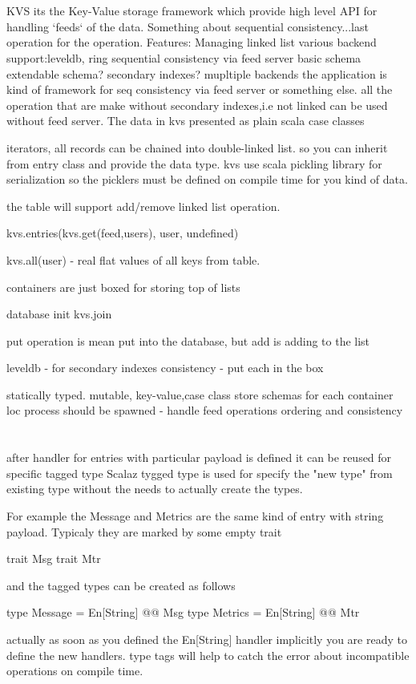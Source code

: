 \section{}
KVS its the Key-Value storage framework which provide high level API for handling `feeds` of the data.
Something about sequential consistency...last operation for the operation.
Features:
Managing linked list
various backend support:leveldb, ring
sequential consistency via feed server
basic schema
extendable schema?
secondary indexes?
mupltiple backends
the application is kind of framework for seq consistency via feed server or something else.
all the operation that are make without secondary indexes,i.e not linked can be used without feed server.
The data in kvs presented as plain scala case classes 

iterators, all records can be chained into double-linked list. so you can inherit from entry class and provide the data type.
kvs use scala pickling library for serialization so the picklers must be defined on compile time for you kind of data.

the table will support add/remove linked list operation.

kvs.entries(kvs.get(feed,users), user, undefined)

kvs.all(user) - real flat values of all keys from table.

containers are just boxed for storing top of lists 

database init kvs.join


put operation is mean put into the database, but add is adding to the list

leveldb - for secondary indexes
consistency - put each in the box


statically typed. mutable, key-value,case class store 
schemas 
for each container loc process should be spawned - handle feed operations ordering and consistency


\section{}

after handler for entries with particular payload is defined
it can be reused for specific tagged type
Scalaz tygged type is used for specify the "new type" from existing type without the needs to actually create the types.


For example the Message and Metrics are the same kind of entry with string payload.
Typicaly they are marked by some empty trait 

trait Msg
trait Mtr

and the tagged types can be created as follows

type Message = En[String] @@ Msg
type Metrics = En[String] @@ Mtr

actually as soon as you defined the En[String] handler implicitly you are ready to define the new handlers.
type tags will help to catch the error about incompatible operations on compile time.
